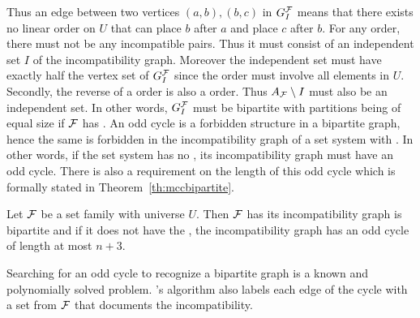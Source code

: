 Thus an edge between two vertices $(a,b), (b,c)$ in $G_I^{{\cal F}}$ means
that there exists no linear order on $U$ that can place $b$ after $a$
and place $c$ after $b$.  For any \COP order, there must not be any
incompatible pairs. Thus it must consist of an independent set $I$ of
the incompatibility graph. Moreover the independent set must have
exactly half the vertex set of $G_I^{\cal F}$ since the \COP order must
involve all elements in $U$. Secondly, the reverse of a \COP order is
also a \COP order. Thus $A_{\cal F} \setminus I$ must also be an
independent set. In other words, $G_I^{\cal F}$ must be bipartite with
partitions being of equal size if ${\cal F}$ has \COP. An odd cycle is a
forbidden structure in a bipartite graph, hence the same is forbidden
in the incompatibility graph of a set system with \COP. In other
words, if the set system has no \COP, its incompatibility graph must
have an odd cycle.  There is also a requirement on the length of this
odd cycle which is formally stated in Theorem~\ref{th:mccbipartite}.

\begin{theoremsansproof} 
  \label{th:mccbipartite}
  Let ${\cal F}$ be a set family with universe $U$. Then ${\cal F}$ has \COP
  \iff its incompatibility graph is bipartite and if it does not have
  the \COP, the incompatibility graph has an odd cycle of length at
  most $n+3$.
\end{theoremsansproof}

Searching for an odd cycle to recognize a bipartite graph is a known
and polynomially solved problem. \cite{mcc04}'s algorithm also labels
each edge of the cycle with a set from ${\cal F}$ that documents the
incompatibility.













